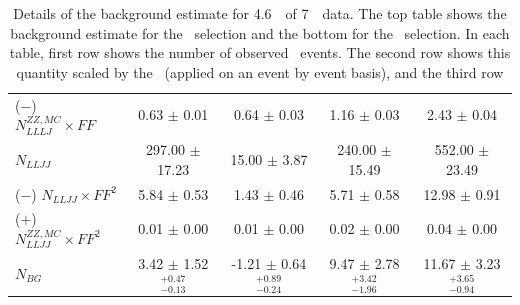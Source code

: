 \begin{table}[htbp]
\begin{tabular}{lcccc}
($-$) $N_{LLLJ}^{ZZ,MC}  \times FF$ &                      0.63 $\pm$ 0.01 &                      0.64 $\pm$ 0.03 &                     1.16 $\pm$ 0.03 &                      2.43 $\pm$ 0.04 \\
$N_{LLJJ}$                          &                   297.00 $\pm$ 17.23 &                     15.00 $\pm$ 3.87 &                  240.00 $\pm$ 15.49 &                   552.00 $\pm$ 23.49 \\
($-$) $N_{LLJJ} \times FF^{2}$      &                      5.84 $\pm$ 0.53 &                      1.43 $\pm$ 0.46 &                     5.71 $\pm$ 0.58 &                     12.98 $\pm$ 0.91 \\
($+$) $N_{LLJJ}^{ZZ,MC}\times FF^2$ &                      0.01 $\pm$ 0.00 &                      0.01 $\pm$ 0.00 &                     0.02 $\pm$ 0.00 &                      0.04 $\pm$ 0.00 \\
\hline                                  
$N_{BG}$                            &  3.42 $\pm$ 1.52 $^{+0.47}_{-0.13}$ &  -1.21 $\pm$ 0.64 $^{+0.89}_{-0.24}$ &  9.47 $\pm$ 2.78 $^{+3.42}_{-1.96}$ &  11.67 $\pm$ 3.23 $^{+3.65}_{-0.94}$ \\
\hline\hline
\end{tabular}
\renewcommand\arraystretch{1.}
\caption{\small Details of the background estimate for 4.6~\ifb\ of 7~\tev\
data. The top table shows the background estimate for the \ZZ\ selection and the
bottom for the \ZZs\ selection. In each table, first row
shows the number of observed \LLLJ\ events. The second row shows this quantity
scaled by the \ffactor\ (applied on an event by event basis), and the third row
}
\end{table}
